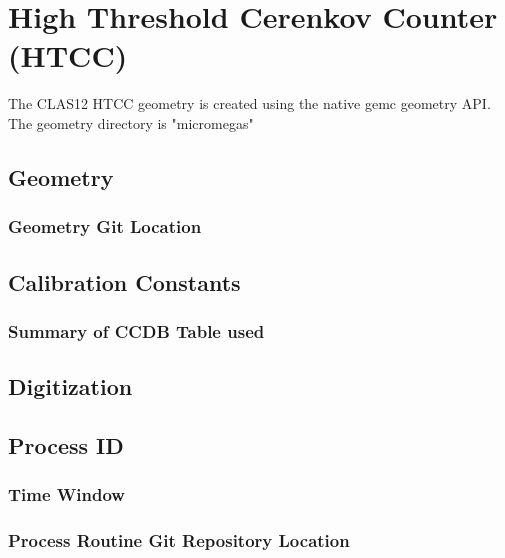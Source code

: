 \section{High Threshold Cerenkov Counter (HTCC)}

The CLAS12 HTCC geometry is created using the native gemc geometry API.
The geometry directory is "micromegas"


\subsection{Geometry}

\subsubsection{Geometry Git Location}

\subsection{Calibration Constants}

\subsubsection{Summary of CCDB Table used}

\subsection{Digitization}

\subsection{Process ID}

\subsubsection{Time Window}

\subsubsection{Process Routine Git Repository Location}


